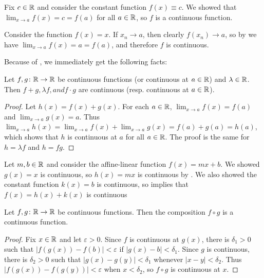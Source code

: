 \documentclass[../notes.tex]{subfiles}
\begin{document}
\begin{example}
    Fix $c\in \mathbb R$ and consider the constant function $f(x)\equiv c$. We showed that $\lim_{x\to a}f(x)=c=f(a)$ for all $a\in \mathbb R$, so $f$ is a continuous function. 
\end{example}

\begin{example}
    Consider the function $f(x) = x$. If $x_n\to a$, then clearly $f(x_n)\to a$, so by  we have $\lim_{x\to a}f(x) = a = f(a)$, and therefore $f$ is continuous.
\end{example}

Because of , we immediately get the following facts: 

\begin{proposition}
    Let $f, g\colon\mathbb R\to \mathbb R$ be continuous functions (or continuous at $a\in \mathbb R$) and $\lambda\in \mathbb R$. Then $f+g, \lambda f, and f\cdot g$ are continuous (resp. continuous at $a\in \mathbb R$). 
\end{proposition}
\begin{proof}
    Let $h(x)=f(x)+g(x)$. For each $a\in \mathbb R$, $\lim_{x\to a}f(x) =f(a)$ and $\lim_{x\to a}g(x)=a$. Thus $\lim_{x\to a}h(x) = \lim_{x\to a}f(x) + \lim_{x\to a}g(x) = f(a) + g(a) = h(a)$, which shows that $h$ is continuous at $a$ for all $a\in \mathbb R$. The proof is the same for $h=\lambda f$ and $h=fg$. 
\end{proof}

\begin{example}
    Let $m, b\in \mathbb R$ and consider the affine-linear function $f(x)=mx+b$. We showed $g(x)=x$ is continuous, so $h(x)=mx$ is continuous by . We also showed the constant function $k(x) = b$ is continuous, so  implies that $f(x) = h(x) +  k(x)$ is continuous
\end{example}

\begin{proposition}
    Let $f,g\colon\mathbb R\to \mathbb R$ be continuous functions. Then the composition $f\circ g$ is a continuous function. 
\end{proposition}
\begin{proof}
    Fix $x\in \mathbb R$ and let $\varepsilon>0$. Since $f$ is continuous at $g(x)$, there is $\delta_1>0$ such that $|f(g(x)) - f(b)| < \varepsilon$ if $|g(x)-b| < \delta_1$. Since $g$ is continuous, there is $\delta_2>0$ such that $|g(x) - g(y)| < \delta_1$ whenever $|x-y| <\delta_2$. Thus $|f(g(x))-f(g(y))| < \varepsilon$ when $x < \delta_2$, so $f\circ g$ is continuous at $x$.   
\end{proof}
\end{document}
